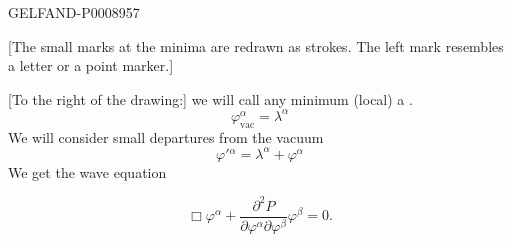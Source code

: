 \begin{GelfandAdjacentEvidence}{GELFAND-P000895}{7}

[The small marks at the minima are redrawn as strokes. The left mark resembles a letter or a point marker.]

[To the right of the drawing:] we will call any minimum (local) a .
\begin{equation*}
\varphi^\alpha_{\text{vac}}=\lambda^\alpha \tag{14}
\end{equation*}
We will consider small departures from the vacuum
\begin{equation*}
\varphi'{}^\alpha=\lambda^\alpha+\varphi^\alpha \tag{15}
\end{equation*}
We get the wave equation
\end{GelfandAdjacentEvidence}

\begin{equation*}
\Box\varphi^\alpha+\frac{\partial^2 P}{\partial\varphi^\alpha\partial\varphi^\beta}\varphi^\beta=0.
\tag{16}
\end{equation*}


